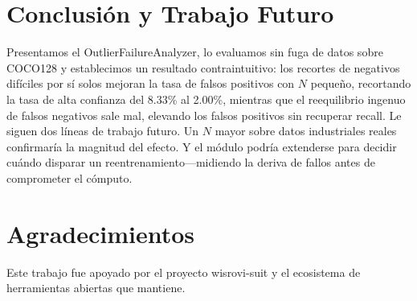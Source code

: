 \documentclass[conference]{IEEEtran}
\begin{document}
\section{Conclusión y Trabajo Futuro}
Presentamos el OutlierFailureAnalyzer, lo evaluamos sin fuga de datos sobre
COCO128 y establecimos un resultado contraintuitivo: los recortes de negativos
difíciles por sí solos mejoran la tasa de falsos positivos con \(N\) pequeño,
recortando la tasa de alta confianza del 8.33\% al 2.00\%, mientras que el
reequilibrio ingenuo de falsos negativos sale mal, elevando los falsos
positivos sin recuperar recall. Le siguen dos líneas de trabajo futuro. Un
\(N\) mayor sobre datos industriales reales confirmaría la magnitud del
efecto. Y el módulo podría extenderse para decidir cuándo disparar un
reentrenamiento---midiendo la deriva de fallos antes de comprometer el
cómputo.

\section*{Agradecimientos}
Este trabajo fue apoyado por el proyecto wisrovi-suit y el ecosistema de
herramientas abiertas que mantiene.



\end{document}
